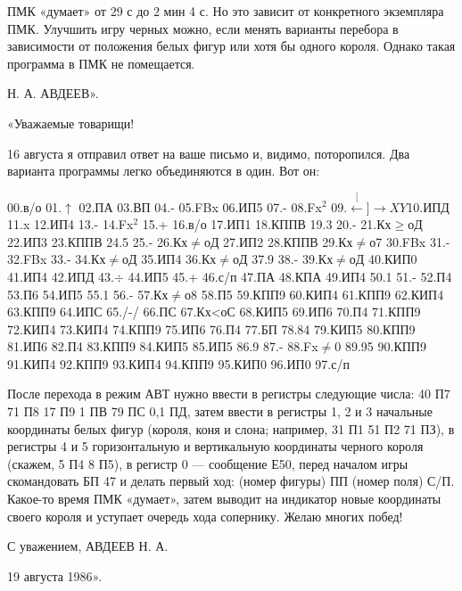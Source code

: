 \documentclass[11pt,a4paper,oneside]{article}
\def\XY{$\stackrel[\leftarrow]{\rightarrow}{XY}$}
\begin{document}
ПМК «думает» от 29 с до 2 мин 4 с. Но это зависит от конкретного экземпляра ПМК. Улучшить игру черных можно, если менять варианты перебора в зависимости от положения белых фигур или хотя бы одного короля. Однако такая программа в ПМК не помещается.

Н. А. АВДЕЕВ».

«Уважаемые товарищи!

16 августа я отправил ответ на ваше письмо и, видимо, поторопился. Два варианта программы легко объединяются в один. Вот он:

00.в/о 01.$\uparrow$ 02.ПА 03.ВП 04.- 05.FBx 06.ИП5 07.- 08.Fx$^{2}$ 09.\XY 10.ИПД 11.x 12.ИП4 13.- 14.Fx$^{2}$ 15.+ 16.в/о 17.ИП1 18.КППВ 19.3 20.- 21.Кх$\geq$оД 22.ИП3
23.КППВ 24.5 25.- 26.Кх$\neq$оД 27.ИП2 28.КППВ 29.Кх$\neq$о7 30.FBx 31.- 32.FBx 33.- 34.Кх$\neq$оД 35.ИП4 36.Кх$\neq$оД 37.9 38.- 39.Кх$\neq$оД 40.КИП0
41.ИП4 42.ИПД 43.$\div$ 44.ИП5 45.+ 46.с/п 47.ПА 48.КПА 49.ИП4 50.1 51.- 52.П4 53.П6 54.ИП5 55.1 56.- 57.Кх$\neq$о8 58.П5 59.КПП9 60.КИП4 61.КПП9 62.КИП4 63.КПП9 64.ИПС 65./-/ 66.ПС 67.Кх<оС 68.КИП5 69.ИП6 70.П4 71.КПП9 72.КИП4 73.КИП4 74.КПП9 75.ИП6 76.П4 77.БП 78.84 79.КИП5 80.КПП9 81.ИП6 82.П4 83.КПП9 84.КИП5 85.ИП5 86.9 87.- 88.Fx$\neq$0 89.95 90.КПП9 91.КИП4 92.КПП9 93.КИП4 94.КПП9 95.КИП0 96.ИП0 97.с/п

После перехода в режим АВТ нужно ввести в регистры следующие числа: 40 П7 71 П8 17 П9 1 ПВ 79 ПС 0,1 ПД, затем ввести в регистры 1, 2 и 3 начальные координаты белых фигур (короля, коня и слона; например, 31 П1 51 П2 71 ПЗ), в регистры 4 и 5 горизонтальную и вертикальную координаты черного короля (скажем, 5 П4 8 П5), в регистр 0 — сообщение Е50, перед началом игры скомандовать БП 47 и делать первый ход: (номер фигуры) ПП (номер поля) С/П. Какое-то время ПМК «думает», затем выводит на индикатор новые координаты своего короля и уступает очередь хода сопернику. Желаю многих побед!

С уважением, АВДЕЕВ Н. А.

19 августа 1986».
\end{document}
